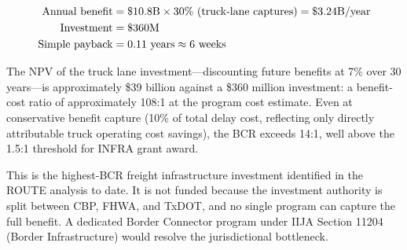 \begin{align}
  \text{Annual benefit} &= \$10.8\text{B} \times 30\% \text{ (truck-lane captures)} = \$3.24\text{B/year} \notag \\
  \text{Investment} &= \$360\text{M} \notag \\
  \text{Simple payback} &= 0.11 \text{ years} \approx \text{6 weeks}
\end{align}

The NPV of the truck lane investment---discounting future benefits at 7\% over 30 years---is approximately \$39 billion against a \$360 million investment: a benefit-cost ratio of approximately 108:1 at the program cost estimate. Even at conservative benefit capture (10\% of total delay cost, reflecting only directly attributable truck operating cost savings), the BCR exceeds 14:1, well above the 1.5:1 threshold for INFRA grant award.

This is the highest-BCR freight infrastructure investment identified in the ROUTE analysis to date. It is not funded because the investment authority is split between CBP, FHWA, and TxDOT, and no single program can capture the full benefit. A dedicated Border Connector program under IIJA Section 11204 (Border Infrastructure) \citep{IIJA2021} would resolve the jurisdictional bottleneck.
